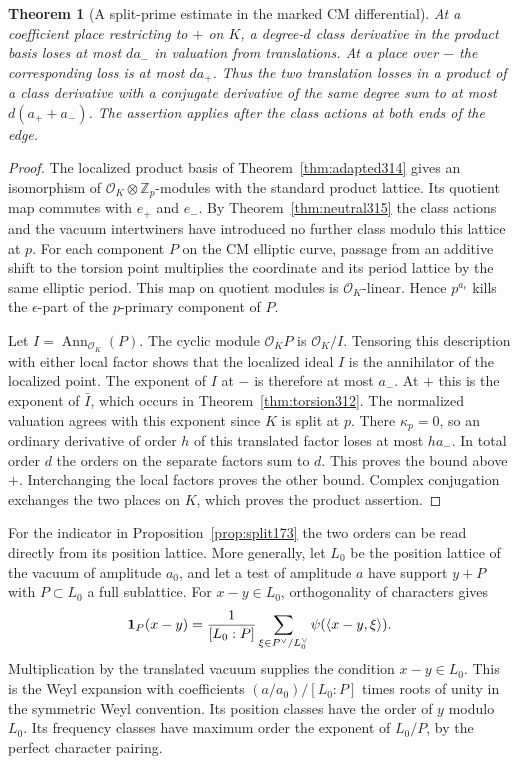 \documentclass[a4paper,11pt]{article}
\newtheorem{theorem}[proposition]{Theorem}
\theoremstyle{definition}
\theoremstyle{remark}
\newcommand{\ZZ}{\mathbb Z}\newcommand{\ord}{\operatorname{ord}}
\numberwithin{equation}{section}
\newcommand{\OO}{\mathcal O}
\begin{document}
\begin{theorem}[A split-prime estimate in the marked CM differential]\leavevmode
\label{thm:splitinput315}
At a coefficient place restricting to \(+\) on \(K\), a
degree-\(d\) class derivative in the product basis loses at most
\(d a_-\) in valuation from translations. At a place over \(-\)
the corresponding loss is at most \(d a_+\). Thus the two
translation losses in a product of a class derivative with a
conjugate derivative of the same degree sum to at most
\(d(a_++a_-)\). The assertion applies after the class actions
at both ends of the edge.
\end{theorem}
\begin{proof}
The localized product basis of Theorem~\ref{thm:adapted314}
gives an isomorphism of \(\OO_K\otimes\ZZ_p\)-modules with
the standard product lattice. Its quotient map commutes with
\(e_+\) and \(e_-\). By Theorem~\ref{thm:neutral315} the class
actions and the vacuum intertwiners have introduced no further
class modulo this lattice at \(p\). For each component \(P\)
on the CM elliptic curve, passage from an additive shift to the
torsion point multiplies the coordinate and its period lattice
by the same elliptic period. This map on quotient modules is
\(\OO_K\)-linear. Hence \(p^{a_\epsilon}\) kills the
\(\epsilon\)-part of the \(p\)-primary component of \(P\).

Let \(I=\operatorname{Ann}_{\OO_K}(P)\).
The cyclic module \(\OO_KP\) is \(\OO_K/I\). Tensoring this
description with either local factor shows that the localized
ideal \(I\) is the annihilator of the localized point.
The exponent of \(I\) at \(-\) is therefore at most \(a_-\).
At \(+\) this is the exponent of \(\bar I\), which occurs in
Theorem~\ref{thm:torsion312}. The normalized valuation agrees
with this exponent since \(K\) is split at \(p\). There
\(\kappa_p=0\), so an ordinary derivative of order \(h\) of
this translated factor loses at most \(ha_-\). In total order
\(d\) the orders on the separate factors sum to \(d\).
This proves the bound above \(+\). Interchanging the local
factors proves the other bound. Complex conjugation exchanges
the two places on \(K\), which proves the product assertion.
\end{proof}

For the indicator in Proposition~\ref{prop:split173} the two
orders can be read directly from its position lattice. More
generally, let \(L_0\) be the position lattice of the vacuum
of amplitude \(a_0\), and let a test of amplitude \(a\) have
support \(y+P\) with \(P\subset L_0\) a full sublattice.
For \(x-y\in L_0\), orthogonality of characters gives
\[
 {\bf1}_P(x-y)=\frac1{[L_0:P]}
       \sum_{\xi\in P^\vee/L_0^\vee}\psi(\langle x-y,\xi\rangle).
\]
Multiplication by the translated vacuum supplies the condition
\(x-y\in L_0\). This is the Weyl expansion with coefficients
\((a/a_0)/[L_0:P]\) times roots of unity in the symmetric Weyl
convention. Its position classes have the order of \(y\) modulo
\(L_0\). Its frequency classes have maximum order the exponent
of \(L_0/P\), by the perfect character pairing.
\end{document}
